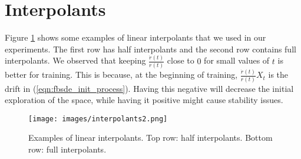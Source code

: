 \section{Interpolants}\label{appndx:interpolants}
Figure \ref{fig:linearInterpolants} shows some examples of linear interpolants that we used in our experiments. The first row has half interpolants and the second row contains full interpolants. We observed that keeping $\frac{\dot r(t)}{r(t)}$ close to $0$ for small values of $t$ is better for training. This is because, at the beginning of training, $\frac{\dot r(t)}{r(t)}X_t$ is the drift in (\ref{eqn:fbsde_init_process}). Having this negative will decrease the initial exploration of the space, while having it positive might cause stability issues. 
\begin{figure}
  \centering
  \texttt{[image: images/interpolants2.png]}
  \caption{Examples of linear interpolants. Top row: half interpolants. Bottom row: full interpolants.}
  \label{fig:linearInterpolants}
\end{figure}


